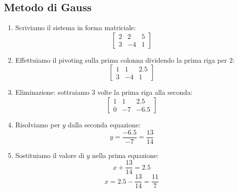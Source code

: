 \documentclass{article}
\begin{document}
\subsection*{Metodo di Gauss}

\begin{enumerate}
    \item Scriviamo il sistema in forma matriciale:
    \begin{equation*}
        \left[\begin{array}{cc|c} 2 & 2 & 5 \\ 3 & -4 & 1 \end{array}\right]
    \end{equation*}
    \item Effettuiamo il pivoting sulla prima colonna dividendo la prima riga per 2:
    \begin{equation*}
        \left[\begin{array}{cc|c} 1 & 1 & 2.5 \\ 3 & -4 & 1 \end{array}\right]
    \end{equation*}
    \item Eliminazione: sottraiamo 3 volte la prima riga alla seconda:
    \begin{equation*}
        \left[\begin{array}{cc|c} 1 & 1 & 2.5 \\ 0 & -7 & -6.5 \end{array}\right]
    \end{equation*}
    \item Risolviamo per $y$ dalla seconda equazione:
    \begin{equation*}
        y = \frac{-6.5}{-7} = \frac{13}{14}
    \end{equation*}
    \item Sostituiamo il valore di $y$ nella prima equazione:
    \begin{equation*}
        x + \frac{13}{14} = 2.5
    \end{equation*}
    \begin{equation*}
        x = 2.5 - \frac{13}{14} = \frac{11}{7}
    \end{equation*}
\end{enumerate}
\end{document}
